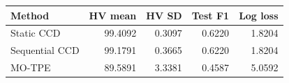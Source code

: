 \begin{tabular}{lrrrr}
\toprule
Method & HV mean & HV SD & Test F1 & Log loss \\
\midrule
Static CCD & 99.4092 & 0.3097 & 0.6220 & 1.8204 \\
Sequential CCD & 99.1791 & 0.3665 & 0.6220 & 1.8204 \\
MO-TPE & 89.5891 & 3.3381 & 0.4587 & 5.0592 \\
\bottomrule
\end{tabular}

